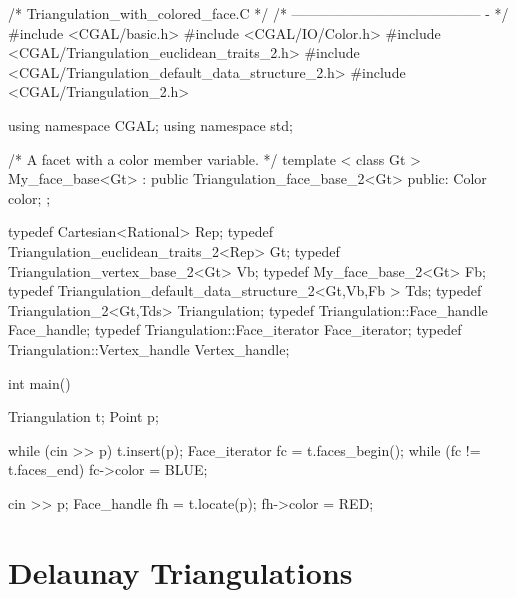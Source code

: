 \begin{cprog}
/*  Triangulation_with_colored_face.C        */
/*  -----------------------------------------   - */
#include <CGAL/basic.h>
#include <CGAL/IO/Color.h>
#include <CGAL/Triangulation_euclidean_traits_2.h>
#include <CGAL/Triangulation_default_data_structure_2.h>
#include <CGAL/Triangulation_2.h>

using namespace CGAL;
using namespace std;

/* A facet with a color member variable. */
template < class Gt >
My_face_base<Gt> : public Triangulation_face_base_2<Gt>
{
public:
    Color color;
};

typedef Cartesian<Rational> Rep;
typedef Triangulation_euclidean_traits_2<Rep> Gt;
typedef Triangulation_vertex_base_2<Gt> Vb;
typedef My_face_base_2<Gt> Fb;
typedef Triangulation_default_data_structure_2<Gt,Vb,Fb > Tds;
typedef Triangulation_2<Gt,Tds> Triangulation;
typedef Triangulation::Face_handle Face_handle;
typedef Triangulation::Face_iterator Face_iterator;
typedef Triangulation::Vertex_handle Vertex_handle;

int main() {
    Triangulation t;
    Point p;
   
    while (cin >> p){
        t.insert(p);
    }
    Face_iterator fc = t.faces_begin();
    while (fc != t.faces_end)
	fc->color = BLUE;

    cin >> p;
    Face_handle fh = t.locate(p);
    fh->color = RED;
}
\end{cprog}


\section{Delaunay Triangulations}
\label{I1_Sect_Delaunay}

